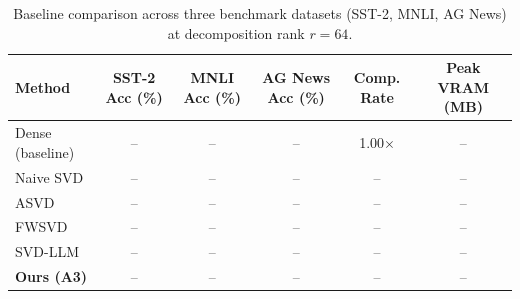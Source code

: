\begin{table}[t]
\centering
\caption{Baseline comparison across three benchmark datasets (SST-2, MNLI, AG News) at decomposition rank $r=64$.}
\label{tab:baselines}
\begin{tabular}{lccc|cc}
\toprule
\textbf{Method} & \textbf{SST-2 Acc (\%)} & \textbf{MNLI Acc (\%)} & \textbf{AG News Acc (\%)} & \textbf{Comp. Rate} & \textbf{Peak VRAM (MB)} \\
\midrule
Dense (baseline)          & -- & -- & -- & 1.00$\times$ & -- \\
Naive SVD                 & -- & -- & -- & -- & -- \\
ASVD \citep{asvd2023}     & -- & -- & -- & -- & -- \\
FWSVD \citep{fwsvd2022}   & -- & -- & -- & -- & -- \\
SVD-LLM \citep{svdllm2024}& -- & -- & -- & -- & -- \\
\midrule
\textbf{Ours (A3)}        & -- & -- & -- & -- & -- \\
\bottomrule
\end{tabular}
\end{table}
